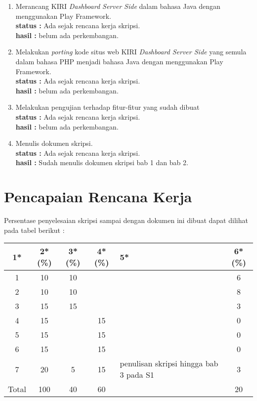 \documentclass[a4paper,twoside]{article}
\begin{document}
\begin{enumerate}
		\item Merancang KIRI \textit{Dashboard Server Side} dalam bahasa Java dengan menggunakan Play Framework.\\
		{\bf status :} Ada sejak rencana kerja skripsi.\\
		{\bf hasil :} belum ada perkembangan.

		\item Melakukan \textit{porting} kode situs web KIRI \textit{Dashboard Server Side} yang semula dalam bahasa PHP menjadi bahasa Java dengan menggunakan Play Framework.\\
		{\bf status :} Ada sejak rencana kerja skripsi.\\
		{\bf hasil :} belum ada perkembangan.
		
		\item Melakukan pengujian terhadap fitur-fitur yang sudah dibuat\\
		{\bf status :} Ada sejak rencana kerja skripsi.\\
		{\bf hasil :} belum ada perkembangan.

		\item Menulis dokumen skripsi.\\
		{\bf status :} Ada sejak rencana kerja skripsi.\\
		{\bf hasil :} Sudah menulis dokumen skripsi bab 1 dan bab 2.
	\end{enumerate}

\section{Pencapaian Rencana Kerja}
Persentase penyelesaian skripsi sampai dengan dokumen ini dibuat dapat dilihat pada tabel berikut :

\begin{center}
  \begin{tabular}{ | c | c | c | c | l | c |}
    \hline
    1*  & 2*(\%) & 3*(\%) & 4*(\%) &5* &6*(\%)\\ \hline \hline
    1   & 10 & 10 &    &  & 6 \\ \hline
    2   & 10 & 10 &    &  & 8 \\ \hline
    3   & 15 & 15 &    &  & 3 \\ \hline
    4   & 15 &    & 15 &  & 0 \\ \hline
    5   & 15 &    & 15 &  & 0 \\ \hline
    6   & 15 &    & 15 &  & 0 \\ \hline
    7   & 20 & 5  & 15 & {\footnotesize penulisan skripsi hingga bab 3 pada S1} & 3 \\ \hline
    Total  & 100  & 40  & 60 &  & 20\\ \hline
                          \end{tabular}
\end{center}
\end{document}

